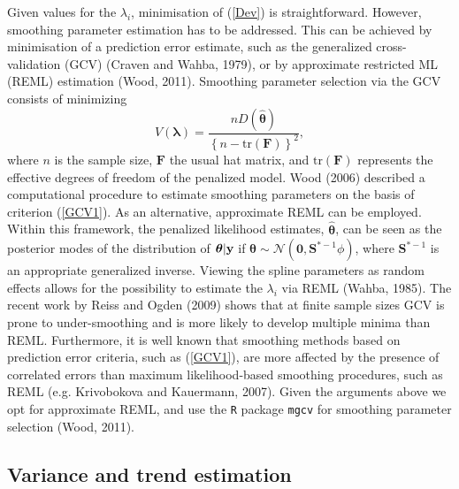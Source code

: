 \documentclass[12pt]{article}
\newcommand{\beq}{\begin{equation}}
\newcommand{\eeq}{\end{equation}}
\theoremstyle{definition}
\theoremstyle{plain}
\begin{document}
Given values for the $\lambda_i$, minimisation of (\ref{Dev}) is straightforward. However, smoothing parameter estimation has to be addressed. This can be achieved by minimisation of a prediction error estimate, such as the generalized cross-validation (GCV) (Craven and Wahba, 1979), or by approximate restricted ML (REML) estimation (Wood, 2011). Smoothing parameter selection via the GCV consists of minimizing 
\beq
V(\bm\lambda)=\frac{nD(\hat{\bm\theta})}{\left\{n-\text{tr}(\textbf{F})\right\}^2},
\label{GCV1}
\eeq
where $n$ is the sample size, $\textbf{F}$ the usual hat matrix, and $\text{tr}(\textbf{F})$ represents the effective degrees of freedom of the penalized model. Wood (2006) described a computational procedure to estimate smoothing parameters on the basis of criterion (\ref{GCV1}). As an alternative, approximate REML can be employed. Within this framework, the penalized likelihood estimates, $\hat{\bm\theta}$, can be seen as the posterior modes of the distribution of $\bm\theta|{\bf y}$ if $\bm\theta \sim \mathcal{N}(\textbf{0},\textbf{S}^{*-1}\phi)$, where $\textbf{S}^{*-1}$ is an appropriate generalized inverse. Viewing the spline parameters as random effects allows for the possibility to estimate the $\lambda_i$ via REML (Wahba, 1985). The recent work by Reiss and Ogden (2009) shows that at finite sample sizes GCV is prone to under-smoothing and is more likely to develop multiple minima than REML. Furthermore, it is well known that smoothing methods based on prediction error criteria, such as (\ref{GCV1}), are more affected by the presence of correlated errors than maximum likelihood-based smoothing procedures, such as REML (e.g. Krivobokova and Kauermann, 2007). Given the arguments above we opt for approximate REML, and use the \texttt{R} package \texttt{mgcv} for smoothing parameter selection (Wood, 2011). 

\subsection{Variance and trend estimation \label{VE}}
\end{document}
